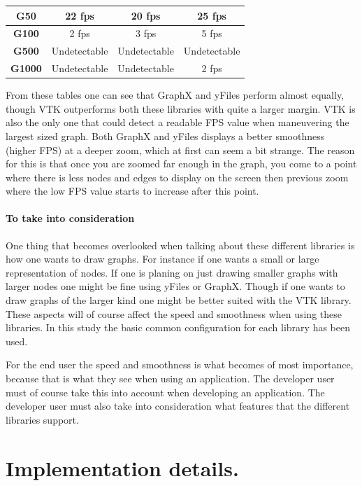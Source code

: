 \documentclass[a4paper,11pt]{kth-mag}
\begin{document}
\begin{appendices}
\begin{table}[h]
\begin{tabular}{|c|c|c|c|}
\textbf{G50}   & 22 fps       & 20 fps       & 25 fps       \\ \hline
\textbf{G100}  & 2 fps        & 3 fps        & 5 fps        \\ \hline
\textbf{G500}  & Undetectable & Undetectable & Undetectable \\ \hline
\textbf{G1000} & Undetectable & Undetectable & 2 fps        \\ \hline
\end{tabular}
\label{table-yFiles:appendix}
\end{table}
\newpage
From these tables one can see that GraphX and yFiles perform almost equally, though VTK outperforms both these libraries with quite a larger margin. VTK is also the only one that could detect a readable 
FPS value when maneuvering the largest sized graph. Both GraphX and yFiles displays a better smoothness (higher FPS) at a deeper zoom, which at first can seem a bit strange. 
The reason for this is that once you are zoomed far enough in the graph, you come to a point where there is less nodes and edges to display on the screen then previous zoom
where the low FPS value starts to increase after this point. 

\subsubsection{To take into consideration}
One thing that becomes overlooked when talking about these different libraries is how one wants to draw graphs. For instance if one wants a small or large representation of nodes. If one is planing on just drawing 
smaller graphs with larger nodes one might be fine using yFiles or GraphX. Though if one wants to draw graphs of the larger kind one might be better suited with the VTK library. These aspects will of course affect 
the speed and smoothness when using these libraries. In this study the basic common configuration for each library has been used.

For the end user the speed and smoothness is what becomes of most importance, because that is what they see when using an application. The developer user must of course take this into account when developing an application.
The developer user must also take into consideration what features that the different libraries support.
 
\chapter{Implementation details.}
\label{appendix:implementation:details}


\end{appendices}
\end{document}
